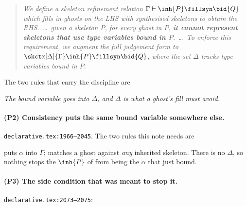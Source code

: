 \documentclass[11pt,a4paper]{article}
\theoremstyle{definition}
\newcommand{\coq}[1]{\texttt{\small #1}}
\begin{document}
\begin{quote}\itshape
  We define a skeleton refinement relation
  $\Gamma \vdash \inh{P}\fillsyn\bid{Q}$ which fills in ghosts on the
  LHS with synthesised skeletons to obtain the RHS.\ \dots\ given a
  skeleton $P$, for every ghost in $P$, \textbf{it cannot represent
  skeletons that use type variables bound in $P$}.\ \dots\ To enforce
  this requirement, we augment the full judgement form to
  $\skctx[\Delta]{\Gamma}\inh{P}\fillsyn\bid{Q}$, where the set $\Delta$
  tracks type variables bound in $P$.
\end{quote}

\noindent
The two rules that carry the discipline are


\noindent
\emph{The bound variable goes into $\Delta$, and $\Delta$ is what a
ghost's fill must avoid.}

\paragraph{(P2) Consistency puts the same bound variable somewhere else.}
\coq{declarative.tex:1966--2045}.  The two rules this note needs are


\noindent
{} puts $\alpha$ into $\Gamma$;  matches a
ghost against \emph{any} inherited skeleton.  There is no $\Delta$, so
nothing stops the $\inh{P}$ of  from being the $\alpha$ that
 just bound.

\paragraph{(P3) The side condition that was meant to stop it.}
\coq{declarative.tex:2073--2075}:
\end{document}
